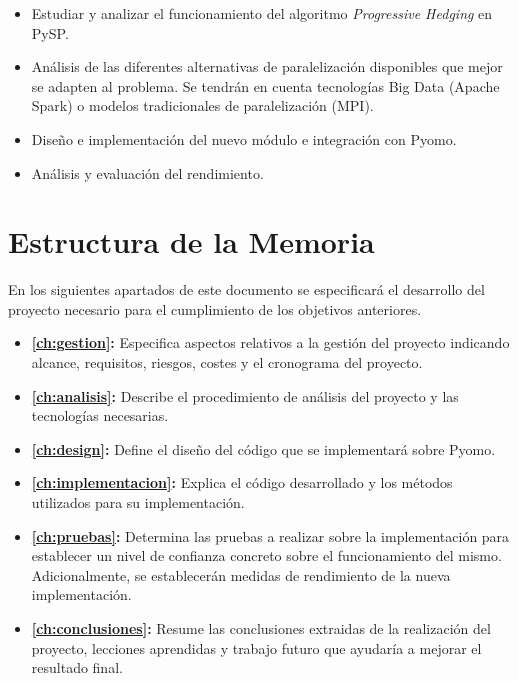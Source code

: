 \begin{itemize}
    \item Estudiar y analizar el funcionamiento del algoritmo \textit{Progressive Hedging} en PySP.
    \item Análisis de las diferentes alternativas de paralelización disponibles que mejor se adapten al problema. Se tendrán en cuenta tecnologías Big Data (Apache Spark) o modelos tradicionales de paralelización (MPI).
    \item Diseño e implementación del nuevo módulo e integración con Pyomo.
    \item Análisis y evaluación del rendimiento.
\end{itemize}

\section{Estructura de la Memoria}


En los siguientes apartados de este documento se especificará el desarrollo del proyecto necesario para el cumplimiento de los objetivos anteriores.

\begin{itemize}
    \item \textbf{\autoref{ch:gestion}: } Especifica aspectos relativos a la gestión del proyecto indicando alcance, requisitos, riesgos, costes y el cronograma del proyecto.
    \item \textbf{\autoref{ch:analisis}: } Describe el procedimiento de análisis del proyecto y las tecnologías necesarias.
    \item \textbf{\autoref{ch:design}: } Define el diseño del código que se implementará sobre Pyomo.
    \item \textbf{\autoref{ch:implementacion}: } Explica el código desarrollado y los métodos utilizados para su implementación.
    \item \textbf{\autoref{ch:pruebas}: } Determina las pruebas a realizar sobre la implementación para establecer un nivel de confianza concreto sobre el funcionamiento del mismo. Adicionalmente, se establecerán medidas de rendimiento de la nueva implementación.
    \item \textbf{\autoref{ch:conclusiones}: } Resume las conclusiones extraidas de la realización del proyecto, lecciones aprendidas y trabajo futuro que ayudaría a mejorar el resultado final.
\end{itemize}